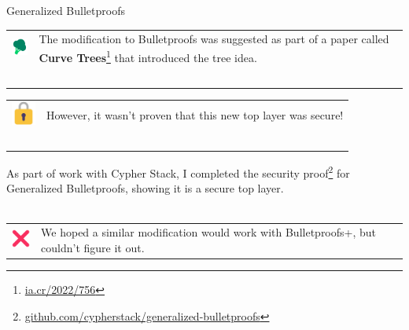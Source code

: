 \documentclass[aspectratio=169]{beamer}
\begin{document}
\begin{frame}{Generalized Bulletproofs}
    \begin{tabular}{>{\arraybackslash}m{40px} >{\arraybackslash}m{320px}}
        \includegraphics[width=30px]{images/tree.png} & The modification to Bulletproofs was suggested as part of a paper called \textbf{Curve Trees}\footnote{\url{ia.cr/2022/756}} that introduced the tree idea. \\~\\
    \end{tabular}

    \begin{tabular}{>{\arraybackslash}m{40px} >{\arraybackslash}m{320px}}
        \includegraphics[width=30px]{images/lock.png} & However, it wasn't proven that this new top layer was secure! \\~\\
    \end{tabular}

    As part of work with Cypher Stack, I completed the security proof\footnote{\url{github.com/cypherstack/generalized-bulletproofs}} for Generalized Bulletproofs, showing it is a secure top layer. \\~\\

    \begin{tabular}{>{\arraybackslash}m{40px} >{\arraybackslash}m{320px}}
        \includegraphics[width=30px]{images/x.png} & We hoped a similar modification would work with Bulletproofs+, but couldn't figure it out.
    \end{tabular}
\end{frame}
\end{document}
